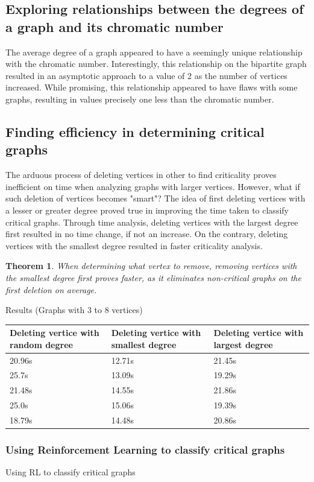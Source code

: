 \documentclass[12pt, letterpaper, twoside]{article}
\newtheorem{theorem}{Theorem}
\begin{document}
\subsection{Exploring relationships between the degrees of a graph and its chromatic number}
The average degree of a graph appeared to have a seemingly unique relationship with the chromatic number. 
Interestingly, this relationship on the bipartite graph resulted in an asymptotic approach to a value of 2 as the number of vertices increased. 
While promising, this relationship appeared to have flaws with some graphs, resulting in values precisely one less than the chromatic number.  

\subsection{Finding efficiency in determining critical graphs}
The arduous process of deleting vertices in other to find criticality proves inefficient on time when analyzing graphs with larger vertices. 
However, what if such deletion of vertices becomes "smart"? 
The idea of first deleting vertices with a lesser or greater degree proved true in improving the time taken to classify critical graphs.
Through time analysis, deleting vertices with the largest degree first resulted in no time change, if not an increase. On the contrary, deleting vertices with the smallest degree resulted in faster criticality analysis.

\begin{theorem}
When determining what vertex to remove, removing vertices with the smallest degree first proves faster, as it eliminates non-critical graphs on the first deletion on average. 
\end{theorem}

Results (Graphs with 3 to 8 vertices)

\begin{tabularx}{0.9\textwidth} { 
  | >{\raggedright\arraybackslash}X 
  | >{\centering\arraybackslash}X 
  | >{\raggedleft\arraybackslash}X | }
  
\toprule
Deleting vertice with random degree & Deleting vertice with smallest degree & Deleting vertice with largest degree \\
\midrule

 20.96s & 12.71s & 21.45s \\
 \hline
 25.7s  & 13.09s  & 19.29s  \\
 \hline
 21.48s  & 14.55s  & 21.86s  \\
 \hline
 25.0s  & 15.06s  & 19.39s  \\
 \hline
 18.79s  & 14.48s  & 20.86s  \\

\hline
\end{tabularx}

\subsubsection{Using Reinforcement Learning to classify critical graphs}
Using RL to classify critical graphs
\end{document}
